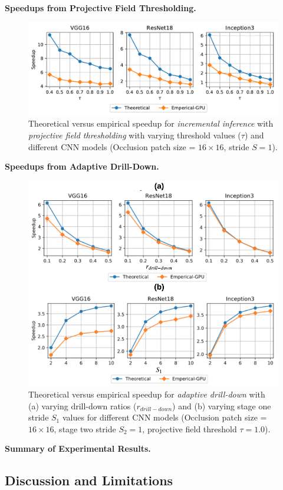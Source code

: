 \vspace{2mm}
\noindent \textbf{Speedups from Projective Field Thresholding.}
\begin{figure}[t]
\includegraphics[width=\columnwidth]{images/5_2_2_GPU}
\caption{Theoretical versus empirical speedup for \textit{incremental inference} with \textit{projective field thresholding} with varying threshold values ($\tau$) and different CNN models (Occlusion patch size = $16 \times 16$, stride $S=1$).}
\label{fig:5_2_1_GPU}
\end{figure}

\vspace{2mm}
\noindent \textbf{Speedups from Adaptive Drill-Down.}

\begin{figure}[t]
\includegraphics[width=\columnwidth]{images/5_2_3_GPU}
\caption{Theoretical versus empirical speedup for \textit{adaptive drill-down} with (a) varying drill-down ratios ($r_{drill-down}$) and (b) varying stage one stride $S_1$ values for different CNN models (Occlusion patch size = $16 \times 16$, stage two stride $S_2=1$, projective field threshold $\tau=1.0$).}
\label{fig:5_2_3_GPU}
\end{figure}

\vspace{2mm}
\noindent \textbf{Summary of Experimental Results.}

\subsection{Discussion and Limitations}
